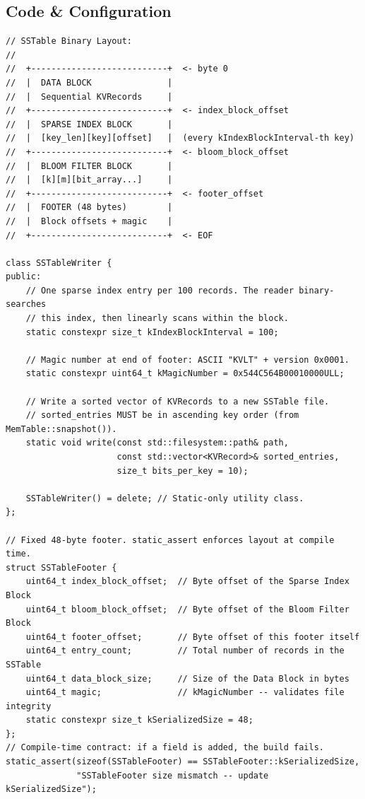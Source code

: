 \documentclass[11pt,a4paper]{article}
\begin{document}
\subsection{Code \& Configuration}

\begin{lstlisting}[style=cpp, caption={SSTable File Layout and Footer: \texttt{include/kvault/sstable\_writer.hpp}}]
// SSTable Binary Layout:
//
//  +---------------------------+  <- byte 0
//  |  DATA BLOCK               |
//  |  Sequential KVRecords     |
//  +---------------------------+  <- index_block_offset
//  |  SPARSE INDEX BLOCK       |
//  |  [key_len][key][offset]   |  (every kIndexBlockInterval-th key)
//  +---------------------------+  <- bloom_block_offset
//  |  BLOOM FILTER BLOCK       |
//  |  [k][m][bit_array...]     |
//  +---------------------------+  <- footer_offset
//  |  FOOTER (48 bytes)        |
//  |  Block offsets + magic    |
//  +---------------------------+  <- EOF

class SSTableWriter {
public:
    // One sparse index entry per 100 records. The reader binary-searches
    // this index, then linearly scans within the block.
    static constexpr size_t kIndexBlockInterval = 100;

    // Magic number at end of footer: ASCII "KVLT" + version 0x0001.
    static constexpr uint64_t kMagicNumber = 0x544C564B00010000ULL;

    // Write a sorted vector of KVRecords to a new SSTable file.
    // sorted_entries MUST be in ascending key order (from MemTable::snapshot()).
    static void write(const std::filesystem::path& path,
                      const std::vector<KVRecord>& sorted_entries,
                      size_t bits_per_key = 10);

    SSTableWriter() = delete; // Static-only utility class.
};

// Fixed 48-byte footer. static_assert enforces layout at compile time.
struct SSTableFooter {
    uint64_t index_block_offset;  // Byte offset of the Sparse Index Block
    uint64_t bloom_block_offset;  // Byte offset of the Bloom Filter Block
    uint64_t footer_offset;       // Byte offset of this footer itself
    uint64_t entry_count;         // Total number of records in the SSTable
    uint64_t data_block_size;     // Size of the Data Block in bytes
    uint64_t magic;               // kMagicNumber -- validates file integrity
    static constexpr size_t kSerializedSize = 48;
};
// Compile-time contract: if a field is added, the build fails.
static_assert(sizeof(SSTableFooter) == SSTableFooter::kSerializedSize,
              "SSTableFooter size mismatch -- update kSerializedSize");
\end{lstlisting}
\end{document}
